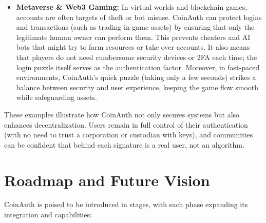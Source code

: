 \documentclass[10pt,letterpaper]{article}
\begin{document}
\begin{itemize}
    \item \textbf{Metaverse \& Web3 Gaming:} In virtual worlds and blockchain games, accounts are often targets of theft or bot misuse. CoinAuth can protect logins and transactions (such as trading in-game assets) by ensuring that only the legitimate human owner can perform them. This prevents cheaters and AI bots that might try to farm resources or take over accounts. It also means that players do not need cumbersome security devices or 2FA each time; the login puzzle itself serves as the authentication factor. Moreover, in fast-paced environments, CoinAuth’s quick puzzle (taking only a few seconds) strikes a balance between security and user experience, keeping the game flow smooth while safeguarding assets.
\end{itemize}

These examples illustrate how CoinAuth not only secures systems but also enhances decentralization. Users remain in full control of their authentication (with no need to trust a corporation or custodian with keys), and communities can be confident that behind each signature is a real user, not an algorithm.

\section{Roadmap and Future Vision}
CoinAuth is poised to be introduced in stages, with each phase expanding its integration and capabilities:
\end{document}
